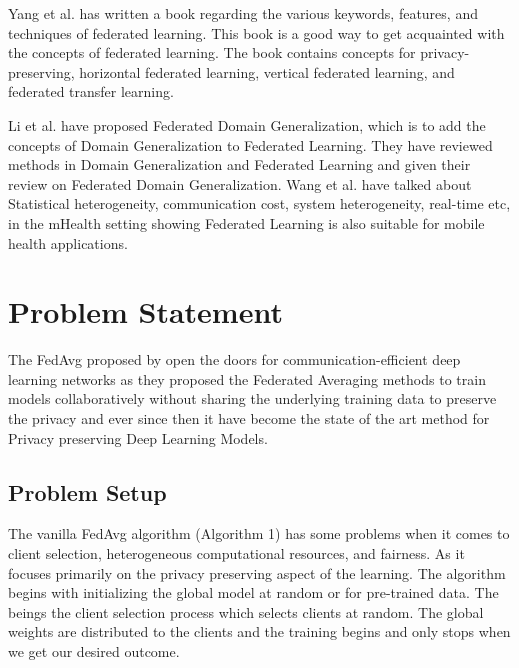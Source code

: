 \documentclass[conference]{IEEEtran}
\begin{document}
\par Yang et al. \cite{yang2019federated} has written a book regarding the various keywords, features, and techniques of federated learning. This book is a good way to get acquainted with the concepts of federated learning. The book contains concepts for privacy-preserving, horizontal federated learning, vertical federated learning, and federated transfer learning. \par
Li et al. \cite{li2023federated} have proposed Federated Domain Generalization, which is to add the concepts of Domain Generalization to Federated Learning. They have reviewed methods in Domain Generalization and Federated Learning and given their review on Federated Domain Generalization. Wang et al. \cite{wang2023applications} have talked about Statistical heterogeneity, communication cost, system heterogeneity, real-time etc, in the mHealth setting showing Federated Learning is also suitable for mobile health applications.

\section{Problem Statement}
The FedAvg proposed by \cite{mcmahan2017communication} open the doors for communication-efficient deep learning networks as they proposed the Federated Averaging methods to train models collaboratively without sharing the underlying training data to preserve the privacy and ever since then it have become the state of the art method for Privacy preserving Deep Learning Models. 
\subsection{Problem Setup} 
The vanilla FedAvg algorithm (Algorithm 1) has some problems when it comes to client selection, heterogeneous computational resources, and fairness. As it focuses primarily on the privacy preserving aspect of the learning. The algorithm begins with initializing the global model at random or for pre-trained data. The beings the client selection process which selects clients at random. The global weights are distributed to the clients and the training begins and only stops when we get our desired outcome.
\end{document}
